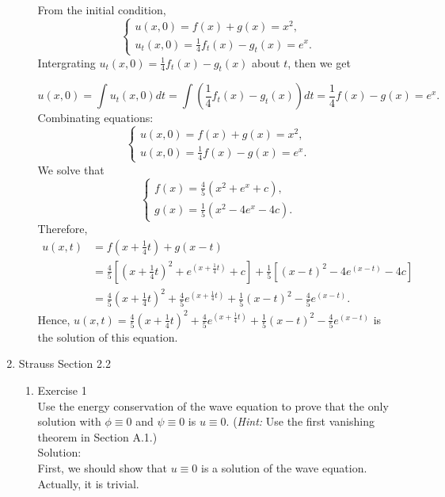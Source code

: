 \documentclass[12pt]{article}%
\begin{document}
\begin{enumerate}
\begin{enumerate}
        From the initial condition, 
        \begin{equation*}
            \begin{cases}
                u(x,0)=f(x)+g(x)=x^2,
                \\
                u_{t}(x,0)=\frac{1}{4}f_{t}(x)-g_{t}(x)=e^x.  
            \end{cases}
        \end{equation*}
        Intergrating $ u_{t}(x,0)=\frac{1}{4}f_{t}(x)-g_{t}(x)$ about $t$, then we get

        \[u(x,0)=\int u_{t}(x,0) dt =\int (\frac{1}{4}f_{t}(x)-g_{t}(x))dt=\frac{1}{4}f(x)-g(x)=e^x.\]
        Combinating equations:
        \begin{equation*}
            \begin{cases}
                u(x,0)=f(x)+g(x)=x^2,
                \\
                u(x,0)=\frac{1}{4}f(x)-g(x)=e^x.
            \end{cases}
        \end{equation*}
        We solve that 
        \begin{equation*}
            \begin{cases}
                f(x)=\frac{4}{5}(x^2+e^x+c),
                \\
                g(x)=\frac{1}{5}(x^2-4e^x-4c).
            \end{cases}
        \end{equation*}
        Therefore,
        \begin{align*}
            u(x,t)&=f(x+\frac{1}{4}t)+g(x-t)\\
            &=\frac{4}{5}[(x+\frac{1}{4}t)^2+e^{(x+\frac{1}{4}t)}+c] + \frac{1}{5}[(x-t)^2-4e^{(x-t)}-4c]\\
            &=\frac{4}{5}(x+\frac{1}{4}t)^2+\frac{4}{5}e^{(x+\frac{1}{4}t)}+\frac{1}{5}(x-t)^2- \frac{4}{5}e^{(x-t)}.
        \end{align*}
        Hence, $u(x,t)=\frac{4}{5}(x+\frac{1}{4}t)^2+\frac{4}{5}e^{(x+\frac{1}{4}t)}+\frac{1}{5}(x-t)^2- \frac{4}{5}e^{(x-t)}$ is the solution of this equation.
         \end{enumerate}

   \pagebreak
    
    \item Strauss Section 2.2 \smallskip
    \begin{enumerate}
        \item Exercise 1 \smallskip \\
        Use the energy conservation of the wave equation to prove that the only solution with $\phi \equiv 0$ and $\psi \equiv 0$ is $u \equiv 0$. (\emph{Hint:} Use the first vanishing theorem in Section A.1.) \smallskip \\
        Solution:\\
         First, we should show that $u\equiv0$ is a solution of the wave equation. Actually, it is trivial. 
        

\end{enumerate}
\end{enumerate}
\end{document}
